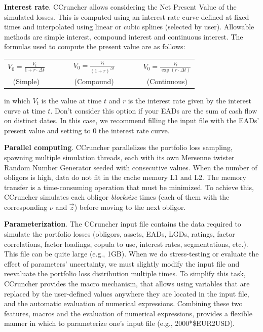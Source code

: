 \documentclass[11pt,fleqn]{book} %
\begin{document}
\textbf{Interest rate}. CCruncher allows considering the Net Present Value 
of the simulated losses. This is computed using an interest rate curve 
defined at fixed times and interpolated using linear or cubic splines 
(selected by user). Allowable methods are simple interest, compound interest 
and continuous interest. The formulas used to compute the present value are
as follows:
\begin{center}
	\begin{tabular}{ccccc}
		$V_0 = \frac{V_t}{1+r \cdot \Delta t}$ & $\qquad$ &
		$V_0 = \frac{V_t}{(1+r)^{\Delta t}}$ & $\qquad$ &
		$V_0 = \frac{V_t}{\exp(r \cdot \Delta t)}$ \\
		(Simple) & $\qquad$ & (Compound) & $\qquad$ & (Continuous)
	\end{tabular}
\end{center}
in which $V_t$ is the value at time $t$ and $r$ is the interest rate given 
by the interest curve at time $t$. Don't consider this option if your EADs
are the sum of cash flow on distinct dates. In this case, we recommend 
filling the input file with the EADs' present value and setting to $0$ the 
interest rate curve.

\textbf{Parallel computing}. 
CCruncher parallelizes the portfolio loss sampling, spawning multiple 
simulation threads, each with its own Mersenne twister Random Number 
Generator seeded with consecutive values. When the number of obligors is 
high, data do not fit in the cache memory L1 and L2. The memory transfer is 
a time-consuming operation that must be minimized. To achieve this, CCruncher 
simulates each obligor \emph{blocksize} times (each of them with the 
corresponding $\nu$ and $\vec{z}$) before moving to the next obligor.

\textbf{Parameterization}. 
The CCruncher input file contains the data required to simulate the portfolio
losses (obligors, assets, EADs, LGDs, ratings, factor correlations, factor
loadings, copula to use, interest rates, segmentations, etc.). This file can 
be quite large (e.g., 1GB). When we do stress-testing or evaluate the effect 
of parameters' uncertainty, we must slightly modify the input file and 
reevaluate the portfolio loss distribution multiple times. To simplify this 
task, CCruncher provides the macro mechanism, that allows using variables 
that are replaced by the user-defined values anywhere they are located in 
the input file, and the automatic evaluation of numerical expressions. 
Combining these two features, macros and the evaluation of numerical 
expressions, provides a flexible manner in which to parameterize one's input 
file (e.g., 2000*\$EUR2USD). 
\end{document}
